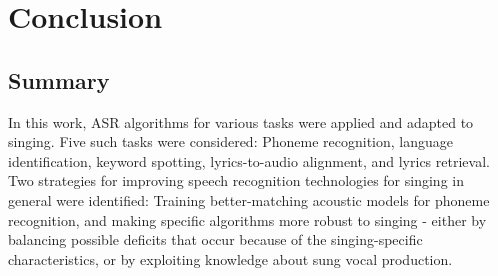 \chapter{Conclusion} \label{chap:conclusion}
\section{Summary}
In this work, ASR algorithms for various tasks were applied and adapted to singing. Five such tasks were considered: Phoneme recognition, language identification, keyword spotting, lyrics-to-audio alignment, and lyrics retrieval.\\

Two strategies for improving speech recognition technologies for singing in general were identified: Training better-matching acoustic models for phoneme recognition, and making specific algorithms more robust to singing - either by balancing possible deficits that occur because of the singing-specific characteristics, or by exploiting knowledge about sung vocal production.\\


